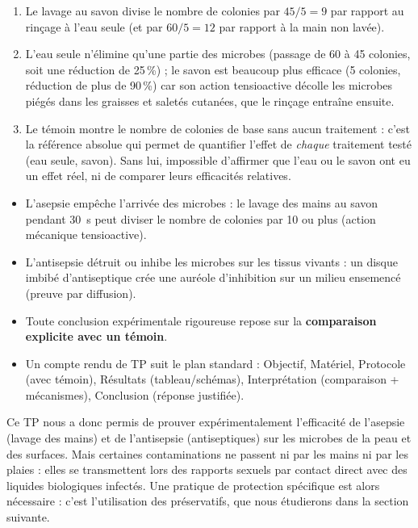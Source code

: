 \documentclass[11pt]{article}
\newcommand{\cle}[1]{{\popxbold\color{popdark}#1}}
\begin{document}
\begin{corrige}[Exercice 1]
\begin{enumerate}
\item Le lavage au savon divise le nombre de colonies par $45/5 = 9$ par rapport au rinçage à l'eau seule (et par $60/5 = 12$ par rapport à la main non lavée).
\item L'eau seule n'élimine qu'une partie des microbes (passage de \num{60} à \num{45} colonies, soit une réduction de 25\,\%) ; le savon est beaucoup plus efficace (\num{5} colonies, réduction de plus de 90\,\%) car son action tensioactive décolle les microbes piégés dans les graisses et saletés cutanées, que le rinçage entraîne ensuite.
\item Le témoin montre le nombre de colonies de base sans aucun traitement : c'est la référence absolue qui permet de quantifier l'effet de \emph{chaque} traitement testé (eau seule, savon). Sans lui, impossible d'affirmer que l'eau ou le savon ont eu un effet réel, ni de comparer leurs efficacités relatives.
\end{enumerate}
\end{corrige}

\begin{aretenir}[L'essentiel du TP N°6]
\begin{itemize}
\item L'\cle{asepsie} empêche l'arrivée des microbes : le lavage des mains au savon pendant \SI{30}{\second} peut diviser le nombre de colonies par 10 ou plus (action mécanique tensioactive).
\item L'\cle{antisepsie} détruit ou inhibe les microbes sur les tissus vivants : un disque imbibé d'antiseptique crée une \cle{auréole d'inhibition} sur un milieu ensemencé (preuve par diffusion).
\item Toute conclusion expérimentale rigoureuse repose sur la \textbf{comparaison explicite avec un témoin}.
\item Un compte rendu de TP suit le plan standard : Objectif, Matériel, Protocole (avec témoin), Résultats (tableau/schémas), Interprétation (comparaison + mécanismes), Conclusion (réponse justifiée).
\end{itemize}
\end{aretenir}

Ce TP nous a donc permis de prouver expérimentalement l'efficacité de l'asepsie (lavage des mains) et de l'antisepsie (antiseptiques) sur les microbes de la peau et des surfaces. Mais certaines contaminations ne passent ni par les mains ni par les plaies : elles se transmettent lors des rapports sexuels par contact direct avec des liquides biologiques infectés. Une pratique de protection spécifique est alors nécessaire : c'est l'utilisation des préservatifs, que nous étudierons dans la section suivante.
\end{document}

